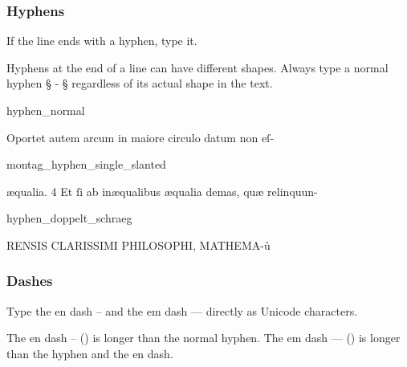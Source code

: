 \subsubsection{Hyphens}
\label{section hyphens}

\begin{mainrule}
If the line ends with a hyphen, type it.
\end{mainrule}

\begin{clarification}
Hyphens at the end of a line can have different shapes. Always type a normal hyphen § - § regardless of its actual shape in the text. %
\end{clarification}

\vspace{2mm}
\begin{sampleImage}{hyphen_normal}
\begin{typeLatin}
Oportet autem arcum in maiore circulo datum non eſ-
\end{typeLatin}
\end{sampleImage}

\begin{sampleImage}{montag_hyphen_single_slanted}
\begin{typeLatin}
æqualia. 4 Et ſi ab inæqualibus æqualia demas, quæ relinquun-
\end{typeLatin}
\end{sampleImage}

\begin{sampleImage}{hyphen_doppelt_schraeg}
\begin{typeLatin}
RENSIS CLARISSIMI PHILOSOPHI, MATHEMA-ů
\end{typeLatin}
\end{sampleImage}

\subsubsection{Dashes}
\label{section dashes}

\begin{mainrule}
Type the en dash – and the em dash — directly as Unicode characters.
\end{mainrule}

\begin{clarification}
The en dash – () is longer than the normal hyphen. The em dash — () is longer than the hyphen and the en dash.
\end{clarification}

